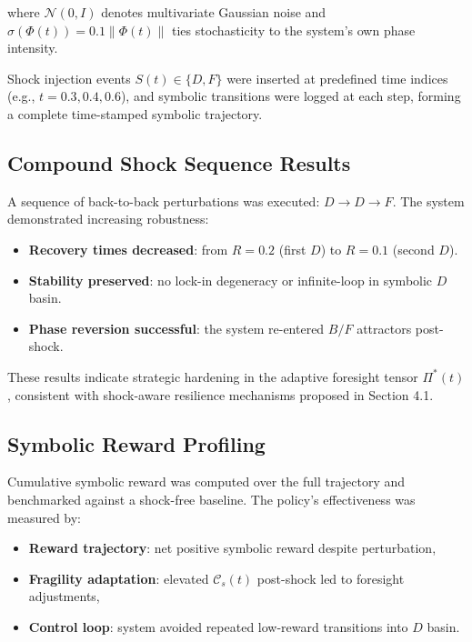 \documentclass[12pt]{article}
\begin{document}
\noindent where $\mathcal{N}(0, I)$ denotes multivariate Gaussian noise and $\sigma(\Phi(t)) = 0.1 \|\Phi(t)\|$ ties stochasticity to the system's own phase intensity. 

Shock injection events $S(t) \in \{D, F\}$ were inserted at predefined time indices (e.g., $t = 0.3, 0.4, 0.6$), and symbolic transitions were logged at each step, forming a complete time-stamped symbolic trajectory.

\subsection{Compound Shock Sequence Results}

A sequence of back-to-back perturbations was executed: $D \rightarrow D \rightarrow F$. The system demonstrated increasing robustness:

\begin{itemize}
  \item \textbf{Recovery times decreased}: from $R = 0.2$ (first $D$) to $R = 0.1$ (second $D$).
  \item \textbf{Stability preserved}: no lock-in degeneracy or infinite-loop in symbolic $D$ basin.
  \item \textbf{Phase reversion successful}: the system re-entered $B/F$ attractors post-shock.
\end{itemize}

These results indicate strategic hardening in the adaptive foresight tensor $\Pi^*(t)$, consistent with shock-aware resilience mechanisms proposed in Section 4.1.

\subsection{Symbolic Reward Profiling}

Cumulative symbolic reward was computed over the full trajectory and benchmarked against a shock-free baseline. The policy's effectiveness was measured by:

\begin{itemize}
  \item \textbf{Reward trajectory}: net positive symbolic reward despite perturbation,
  \item \textbf{Fragility adaptation}: elevated $\mathcal{C}_s(t)$ post-shock led to foresight adjustments,
  \item \textbf{Control loop}: system avoided repeated low-reward transitions into $D$ basin.
\end{itemize}
\end{document}
